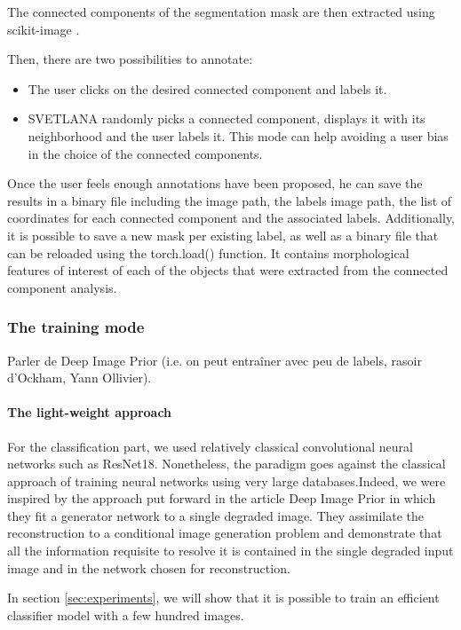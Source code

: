 \documentclass{article}
\begin{document}
The connected components of the segmentation mask are then extracted using scikit-image \cite{van2014scikit}. 

Then, there are two possibilities to annotate: 
\begin{itemize}
  \item The user clicks on the desired connected component and labels it. 
  \item SVETLANA randomly picks a connected component, displays it with its neighborhood and the user labels it. This mode can help avoiding a user bias in the choice of the connected components.
\end{itemize}

Once the user feels enough annotations have been proposed, he can save the results in a binary file including the image path, the labels image path, the list of coordinates for each connected component and the associated labels.
Additionally, it is possible to save a new mask per existing label, as well as a binary file that can be reloaded using the torch.load() function. It contains morphological features of interest of each of the objects that were extracted from the connected component analysis.


\subsubsection{The training mode}


Parler de Deep Image Prior (i.e. on peut entraîner avec peu de labels, rasoir d'Ockham, Yann Ollivier).

\paragraph*{The light-weight approach}


For the classification part, we used relatively classical convolutional neural networks such as ResNet18. Nonetheless, the paradigm goes against the classical approach of training neural networks using very large databases.Indeed, we were inspired by the approach put forward in the article Deep Image Prior\cite{lempitsky2018deep} in which they fit a generator network to a single degraded image. They assimilate the reconstruction to a conditional image generation problem and demonstrate that all the information requisite to resolve it is contained in the single degraded input image and in the network chosen for reconstruction.

In section \ref{sec:experiments}, we will show that it is possible to train an efficient classifier model with a few hundred images.
\end{document}

